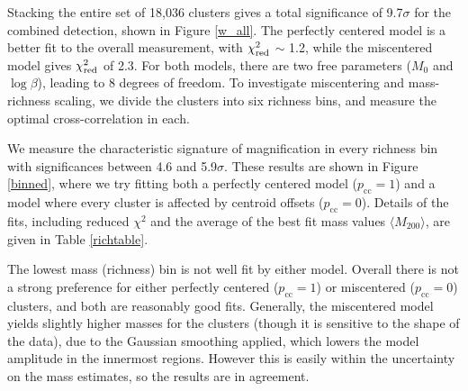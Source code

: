 Stacking the entire set of 18,036 clusters gives a total significance of 9.7$\sigma$ for the combined detection, shown in Figure \ref{w_all}. The perfectly centered model is a better fit to the overall measurement, with $\chi^2_{\rm red}$ $\sim$ 1.2, while the miscentered model gives $\chi^2_{\rm red}$ of 2.3. For both models, there are two free parameters ($M_0$ and $\log\beta$), leading to 8 degrees of freedom. To investigate miscentering and mass-richness scaling, we divide the clusters into six richness bins, and measure the optimal cross-correlation in each. 

We measure the characteristic signature of magnification in every richness bin with significances between 4.6 and 5.9$\sigma$. These results are shown in Figure \ref{binned}, where we try fitting both a perfectly centered model ($p_{\mathrm{cc}}=1$) and a model where every cluster is affected by centroid offsets ($p_{\mathrm{cc}}=0$). Details of the fits, including reduced $\chi^2$ and the average of the best fit mass values $\langle M_{200} \rangle$, are given in Table \ref{richtable}.

The lowest mass (richness) bin is not well fit by either model. Overall there is not a strong preference for either perfectly centered ($p_{\mathrm{cc}}=1$) or miscentered ($p_{\mathrm{cc}}=0$) clusters, and both are reasonably good fits. Generally, the miscentered model yields slightly higher masses for the clusters (though it is sensitive to the shape of the data), due to the Gaussian smoothing applied, which lowers the model amplitude in the innermost regions. However this is easily within the uncertainty on the mass estimates, so the results are in agreement.


